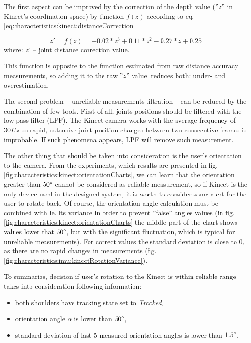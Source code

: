\documentclass{llncs}
\begin{document}
The first aspect can be improved by the correction of the depth value (''$z$'' in Kinect's coordination space) by function $f(z)$ according to eq. \eqref{eq:characteristics:kinect:distanceCorrection} 

\begin{equation}
	z' = f(z) = -0.02*z^3 + 0.11*z^2 - 0.27*z + 0.25
	\label{eq:characteristics:kinect:distanceCorrection}
\end{equation}
where: $z'$ -- joint distance correction value.

This function is opposite to the function estimated from raw distance accuracy measurements, so adding it to the raw ''$z$'' value, reduces both: under- and overestimation.

The second problem -- unreliable measurements filtration -- can be reduced by the combination of few tools. First of all, joints positions should be filtered with the low pass filter (LPF). The Kinect camera works with the average frequency of $30Hz$ so rapid, extensive joint position changes between two consecutive frames is improbable. If such phenomena appears, LPF will remove such measurement. 

The other thing that should be taken into consideration is the user's orientation to the camera. From the experiments, which results are presented in fig. \ref{fig:characteristics:kinect:orientationCharts}, we can learn that the orientation greater than $50\degree$ cannot be considered as reliable measurement, so if Kinect is the only device used in the designed system, it is worth to consider some alert for the user to rotate back. Of course, the orientation angle calculation must be combined with ie. its variance in order to prevent ''false'' angles values (in fig. \ref{fig:characteristics:kinect:orientationCharts} the middle part of the chart shows values lower that $50\degree$, but with the significant fluctuation, which is typical for unreliable measurements). For correct values the standard deviation is close to 0, as there are no rapid changes in measurements (fig. \ref{fig:characteristics:imu:kinectRotationVariance}).

To summarize, decision if user's rotation to the Kinect is within reliable range takes into consideration following information:
\begin{itemize}
	\item both shoulders have tracking state set to \textsl{Tracked},
	\item orientation angle $\alpha$ is lower than $50\degree$,
	\item standard deviation of last 5 measured orientation angles is lower than $1.5\degree$.
\end{itemize}
\end{document}
